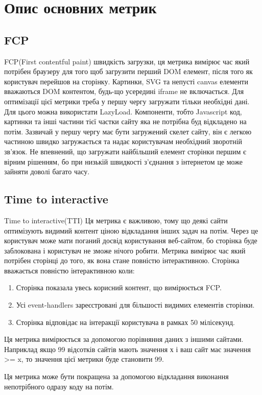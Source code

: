 \section{Опис основних метрик}
\subsection{FCP}
FCP(First contentful paint) швидкість загрузки, ця метрика вимірює час який потрібен браузеру для того щоб загрузити перший DOM
елемент, після того як користувач перейшов на сторінку.
Картинки, SVG та непусті canvas елементи вважаються DOM контентом, будь-що усередині iframe не включається.
Для оптимізації цієї метрики треба у першу чергу загружати тільки необхідні дані. Для цього можна використати LazyLoad.
Компоненти, тобто Javascript код, картинки та інші частини тієї частки сайту яка не потрібна буд відкладено на потім.
Зазвичай у першу чергу має бути загружений скелет сайту, він є легкою частиною швидко загружається та надає користувачам
необхідний зворотній зв'язок.
Не впевнений, що загружати найбільший елемент сторінки першим є вірним рішенням,
бо при низькій швидкості з'єднання з інтернетом це може зайняти доволі багато часу.
\subsection{Time to interactive}
Time to interactive(TTI)
Ця метрика є важливою, тому що деякі сайти оптимізують видимий контент ціною відкладання інших задач на потім.
Через це користувач може мати поганий досвід користування веб-сайтом, бо сторінка буде заблокована
і користувач не зможе нічого робити.
Метрика вимірює час який потрібен сторінці до того, як вона стане повністю інтерактивною.
Сторінка вважається повністю інтерактивною коли:
\begin{enumerate}
    \item Сторінка показала увесь корисний контент, що вимірюється FCP.
    \item Усі event-handlers зареєстровані для більшості видимих елементів сторінки.
    \item Сторінка відповідає на інтеракції користувача в рамках 50 мілісекунд.
\end{enumerate}

Ця метрика вимірюється за допомогою порівняння даних з іншими сайтами.
Наприклад якщо 99 відсотків сайтів мають значення х і ваш сайт має значення >= x, то значення цієї метрики буде становити 99.

Ця метрика може бути покращена за допомогою відкладання виконання непотрібного одразу коду на потім.

